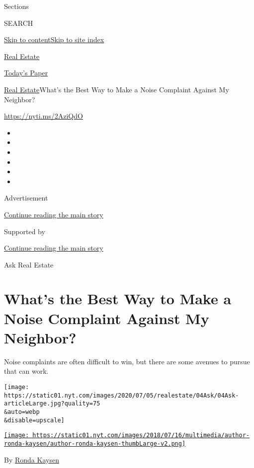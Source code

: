 Sections

SEARCH

\protect\hyperlink{site-content}{Skip to
content}\protect\hyperlink{site-index}{Skip to site index}

\href{https://www.nytimes.com/section/realestate}{Real Estate}

\href{https://myaccount.nytimes.com/auth/login?response_type=cookie\&client_id=vi}{}

\href{https://www.nytimes.com/section/todayspaper}{Today's Paper}

\href{/section/realestate}{Real Estate}\textbar{}What's the Best Way to
Make a Noise Complaint Against My Neighbor?

\url{https://nyti.ms/2AziQdO}

\begin{itemize}
\item
\item
\item
\item
\item
\item
\end{itemize}

Advertisement

\protect\hyperlink{after-top}{Continue reading the main story}

Supported by

\protect\hyperlink{after-sponsor}{Continue reading the main story}

Ask Real Estate

\hypertarget{whats-the-best-way-to-make-a-noise-complaint-against-my-neighbor}{%
\section{What's the Best Way to Make a Noise Complaint Against My
Neighbor?}\label{whats-the-best-way-to-make-a-noise-complaint-against-my-neighbor}}

Noise complaints are often difficult to win, but there are some avenues
to pursue that can work.

\texttt{[image: https://static01.nyt.com/images/2020/07/05/realestate/04Ask/04Ask-articleLarge.jpg?quality=75\\\&auto=webp\\\&disable=upscale]}

\href{https://www.nytimes.com/by/ronda-kaysen}{\texttt{[image: https://static01.nyt.com/images/2018/07/16/multimedia/author-ronda-kaysen/author-ronda-kaysen-thumbLarge-v2.png]}}

By \href{https://www.nytimes.com/by/ronda-kaysen}{Ronda Kaysen}

